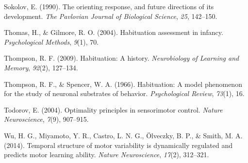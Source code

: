 \documentclass[10pt, letterpaper]{article}
\newenvironment{CSLReferences}%
  {}%
  {\par}
\begin{document}
\begin{CSLReferences}{1}{0}
\leavevmode{}%
Sokolov, E. (1990). The orienting response, and future directions of its
development. \emph{The Pavlovian Journal of Biological Science},
\emph{25}, 142--150.

\leavevmode{}%
Thomas, H., \& Gilmore, R. O. (2004). Habituation assessment in infancy.
\emph{Psychological Methods}, \emph{9}(1), 70.

\leavevmode{}%
Thompson, R. F. (2009). Habituation: A history. \emph{Neurobiology of
Learning and Memory}, \emph{92}(2), 127--134.

\leavevmode{}%
Thompson, R. F., \& Spencer, W. A. (1966). Habituation: A model
phenomenon for the study of neuronal substrates of behavior.
\emph{Psychological Review}, \emph{73}(1), 16.

\leavevmode{}%
Todorov, E. (2004). Optimality principles in sensorimotor control.
\emph{Nature Neuroscience}, \emph{7}(9), 907--915.

\leavevmode{}%
Wu, H. G., Miyamoto, Y. R., Castro, L. N. G., Ölveczky, B. P., \& Smith,
M. A. (2014). Temporal structure of motor variability is dynamically
regulated and predicts motor learning ability. \emph{Nature
Neuroscience}, \emph{17}(2), 312--321.

\end{CSLReferences}


\end{document}
